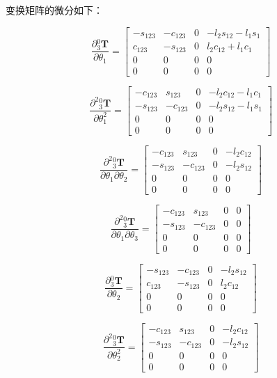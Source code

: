 \documentclass{homework}
\begin{document}
\begin{sol}
变换矩阵的微分如下：

\[
  \frac{\partial {_3^0}\mathbf{T}}{\partial \theta_1} =
  \begin{bmatrix} 
    -s_{123} & -c_{123} & 0 & -l_{2} s_{12} - l_{1} s_{1} \\ 
    c_{123} & -s_{123} & 0 & l_{2} c_{12} + l_{1} c_{1} \\ 
    0 & 0 & 0 & 0 \\ 
    0 & 0 & 0 & 0
  \end{bmatrix}
\]

\[
  \frac{\partial^2 {_3^0}\mathbf{T}}{\partial \theta_1^2} =
  \begin{bmatrix} 
    -c_{123} & s_{123} & 0 & -l_{2} c_{12} - l_{1} c_{1} \\ 
    -s_{123} & -c_{123} & 0 & -l_{2} s_{12} - l_{1} s_{1} \\ 
    0 & 0 & 0 & 0 \\ 
    0 & 0 & 0 & 0
  \end{bmatrix}
\]

\[
  \frac{\partial^2 {_3^0}\mathbf{T}}{\partial \theta_1 \partial \theta_2} =
  \begin{bmatrix} 
    -c_{123} & s_{123} & 0 & -l_{2} c_{12} \\ 
    -s_{123} & -c_{123} & 0 & -l_{2} s_{12} \\ 
    0 & 0 & 0 & 0 \\ 
    0 & 0 & 0 & 0
  \end{bmatrix}
\]

\[
  \frac{\partial^2 {_3^0}\mathbf{T}}{\partial \theta_1 \partial \theta_3} =
  \begin{bmatrix} 
    -c_{123} & s_{123} & 0 & 0 \\ 
    -s_{123} & -c_{123} & 0 & 0 \\ 
    0 & 0 & 0 & 0 \\ 
    0 & 0 & 0 & 0
  \end{bmatrix}
\]

\[
  \frac{\partial {_3^0}\mathbf{T}}{\partial \theta_2} =
  \begin{bmatrix} 
    -s_{123} & -c_{123} & 0 & -l_{2} s_{12} \\ 
    c_{123} & -s_{123} & 0 & l_{2} c_{12} \\ 
    0 & 0 & 0 & 0 \\ 
    0 & 0 & 0 & 0
  \end{bmatrix}
\]

\[
  \frac{\partial^2 {_3^0}\mathbf{T}}{\partial \theta_2^2} =
  \begin{bmatrix} 
    -c_{123} & s_{123} & 0 & -l_{2} c_{12} \\ 
    -s_{123} & -c_{123} & 0 & -l_{2} s_{12} \\ 
    0 & 0 & 0 & 0 \\ 
    0 & 0 & 0 & 0
  \end{bmatrix}
\]


\end{sol}
\end{document}
